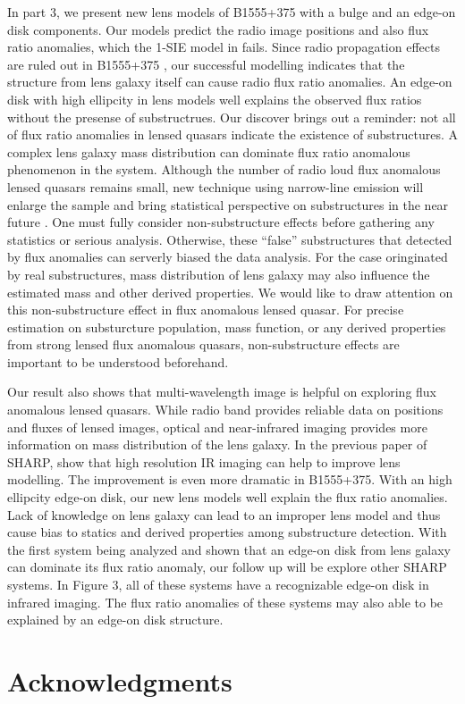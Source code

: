 \documentclass[useAMS,usenatbib]{mn2e}
\begin{document}
In part 3, we present new lens models of B1555+375 with a bulge and an edge-on disk components. Our models predict the radio image positions and also flux ratio anomalies, which the 1-SIE model in \citet{Marlow} fails. Since radio propagation effects are ruled out in B1555+375 \citep{K03,KD04}, our successful modelling indicates that the structure from lens galaxy itself can cause radio flux ratio anomalies. An edge-on disk with high ellipcity in lens models well explains the observed flux ratios without the presense of substructrues. Our discover brings out a reminder: not all of flux ratio anomalies in lensed quasars indicate the existence of substructures. A complex lens galaxy mass distribution can dominate flux ratio anomalous phenomenon in the system. Although the number of radio loud flux anomalous lensed quasars remains small, new technique using narrow-line emission will enlarge the sample and bring statistical perspective on substructures in the near future \citep{N14}. One must fully consider non-substructure effects before gathering any statistics or serious analysis. Otherwise, these ``false'' substructures that detected by flux anomalies can serverly biased the data analysis. For the case oringinated by real substructures, mass distribution of lens galaxy may also influence the estimated mass and other derived properties. We would like to draw attention on this non-substructure effect in flux anomalous lensed quasar. For precise estimation on substurcture population, mass function, or any derived properties from strong lensed flux anomalous quasars, non-substructure effects are important to be understood beforehand.

Our result also shows that multi-wavelength image is helpful on exploring flux anomalous lensed quasars. While radio band provides reliable data on positions and fluxes of lensed images, optical and near-infrared imaging provides more information on mass distribution of the lens galaxy. In the previous paper of SHARP, \citet{SHARP12} show that high resolution IR imaging can help to improve lens modelling. The improvement is even more dramatic in B1555+375. With an high ellipcity edge-on disk, our new lens models well explain the flux ratio anomalies. Lack of knowledge on lens galaxy can lead to an improper lens model and thus cause bias to statics and derived properties among substructure detection. With the first system being analyzed and shown that an edge-on disk from lens galaxy can dominate its flux ratio anomaly, our follow up will be explore other SHARP systems. In Figure 3, all of these systems have a recognizable edge-on disk in infrared imaging. The flux ratio anomalies of these systems may also able to be explained by an edge-on disk structure.\\
 

\section*{Acknowledgments}







\label{lastpage}
\end{document}
